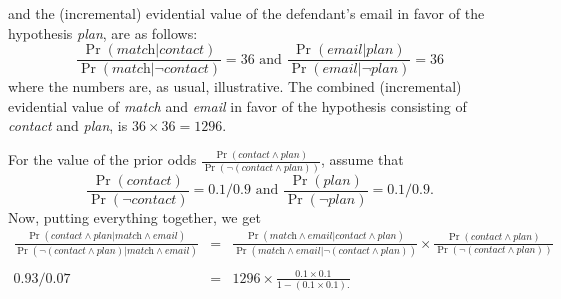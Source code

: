 \documentclass[10pt]{article}
\begin{document}
and the (incremental) evidential value of the defendant's email in favor of 
the hypothesis \textit{plan}, are as follows:
%
\[\frac{\Pr(\textit{match}| \textit{contact})}{\Pr(\textit{match} | \neg \textit{contact})}=36 \text{ and } \frac{\Pr(\textit{email}| \textit{plan})}{\Pr(\textit{email}| \neg \textit{plan})}=36\]
%
where the numbers are, as usual, illustrative. The combined (incremental) evidential value of \textit{match} and \textit{email} 
in favor of the hypothesis consisting of \textit{contact} and \textit{plan}, is $36\times 36 = 1296$.
%

 \noindent
For the value of the prior odds $\frac{\Pr(\textit{contact}\wedge \textit{plan})}{\Pr(\neg (\textit{contact} \wedge \textit{plan}))}$, assume that 
%
\[\frac{\Pr(\textit{contact})}{\Pr(\neg \textit{contact})}=0.1/0.9 \text{ and } \frac{\Pr(\textit{plan})}{\Pr(\neg \textit{plan})}=0.1/0.9.\]
%
Now, putting everything together, we get
 \begin{eqnarray*} %
 \frac{\Pr(\textit{contact}\wedge \textit{plan} | \textit{match} \wedge \textit{email})}{\Pr(\neg (\textit{contact} \wedge \textit{plan}) | \textit{match} \wedge \textit{email})} 
 & = & \frac{\Pr(\textit{match} \wedge \textit{email} | \textit{contact}\wedge \textit{plan})}{\Pr(\textit{match} \wedge \textit{email} | \neg (\textit{contact} \wedge \textit{plan}))} \times 
\frac{\Pr(\textit{contact}\wedge \textit{plan})}{\Pr(\neg (\textit{contact} \wedge \textit{plan}))} \\ 
 &&\\
0.93/0.07 & = & 1296 \times \frac{0.1\times 0.1}{1-(0.1\times 0.1).}
 \end{eqnarray*} %
\end{document}
